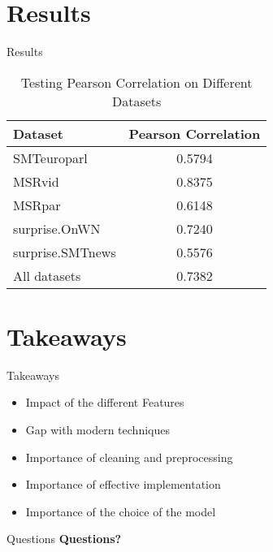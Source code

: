 \documentclass[usenames,dvipsnames]{beamer}
\begin{document}
\section{Results}

\begin{frame}{Results}
    \begin{table}[h]
        \centering
        \begin{tabular}{|l|c|}
            \hline
            \textbf{Dataset} & \textbf{Pearson Correlation} \\ \hline
            SMTeuroparl & 0.5794 \\ \hline
            MSRvid & 0.8375 \\ \hline
            MSRpar & 0.6148 \\ \hline
            surprise.OnWN & 0.7240 \\ \hline
            surprise.SMTnews & 0.5576 \\ \hline
            All datasets & 0.7382 \\ \hline
        \end{tabular}
        \caption{Testing Pearson Correlation on Different Datasets}
        \label{tab:pearson-correlation}
    \end{table}  
\end{frame}


\section{Takeaways}

\begin{frame}{Takeaways}
    \begin{itemize}
        \item Impact of the different Features
        \item Gap with modern techniques
        \item Importance of cleaning and preprocessing
        \item Importance of effective implementation
        \item Importance of the choice of the model
    \end{itemize}
\end{frame}

\begin{frame}{Questions}
    \centering
    {\Huge \textbf{Questions?}}
\end{frame}
\end{document}
